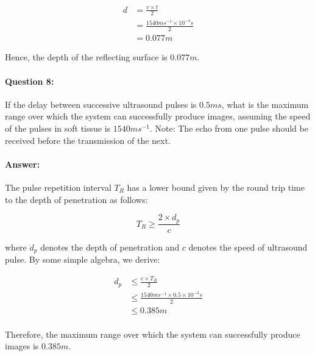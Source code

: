 \documentclass[12pt, letter]{article}
\begin{document}
\begin{equation}
\begin{split}
        d & = \frac{v\times t}{2} \\
          & = \frac{1540 ms^{-1} \times 10^{-4}s}{2} \\
          & = 0.077m
\end{split}
\end{equation}

Hence, the depth of the reflecting surface is $0.077 m$.

\paragraph{Question 8:} If the delay between successive ultrasound pulses is $0.5 ms$, what is the maximum range over which the system can successfully produce images, assuming the speed of the pulses in soft tissue is $1540 ms^{-1}$. Note: The echo from one pulse should be received before the transmission of the next.

\paragraph{Answer: }The pulse repetition interval $T_R$ has a lower bound given by the round trip time to the depth of penetration as follows:

\begin{equation}
    T_R \geqslant \frac{2 \times d_p}{c}
\end{equation}

where $d_p$ denotes the depth of penetration and $c$ denotes the speed of ultrasound pulse. By some simple algebra, we derive:

\begin{equation}
    \begin{split}
            d_p & \leqslant \frac{c \times T_R}{2} \\
                & \leqslant \frac{1540 ms^{-1} \times 0.5 \times 10^{-3}s}{2} \\
                & \leqslant 0.385 m \\
    \end{split}
\end{equation}

Therefore, the maximum range over which the system can successfully produce images is $0.385m$.
\end{document}
